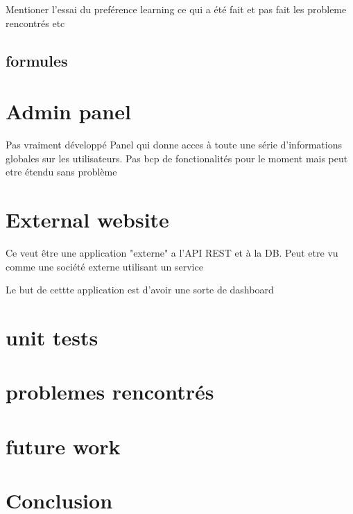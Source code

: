  Mentioner l'essai du preférence learning ce qui a été fait et pas fait les probleme rencontrés etc
 \subsection{formules}

\section{Admin panel}
Pas vraiment développé
Panel qui donne acces à toute une série d'informations globales sur les utilisateurs. Pas bcp de fonctionalités pour le moment mais peut etre étendu sans problème

\section{External website}
Ce veut être une application "externe" a l'API REST et à la DB. Peut etre vu comme une société externe utilisant un service

Le but de cettte application est d'avoir une sorte de dashboard

\section{unit tests}

\section{problemes rencontrés}
\section{future work}
\section{Conclusion}
